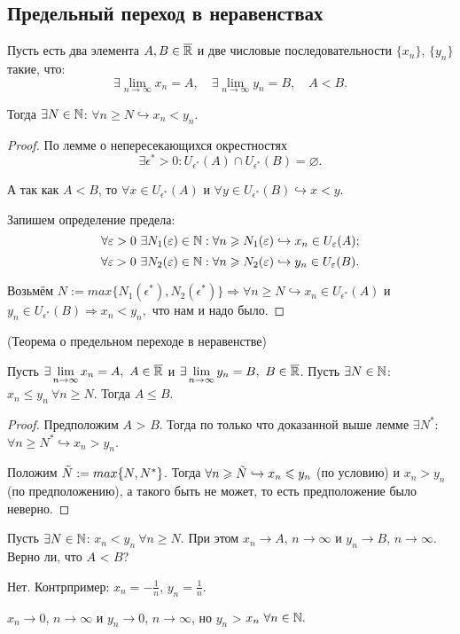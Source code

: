 \newpage
\subsection{Предельный переход в неравенствах}
\begin{lemma}
    Пусть есть два элемента $A, B \in \overline{\R}$ и две числовые последовательности $\{ x_{n} \}$, $\{ y_{n} \}$ такие, что:
    $$\exists \lim\limits_{n\to \infty} x_{n} = A, \quad \exists \lim\limits_{n\to \infty} y_{n} = B, \quad A < B.$$

    Тогда $\exists N \in \N$: $\forall n \geq N \hookrightarrow x_{n} < y_{n}.$
\end{lemma}
\begin{proof}
    По лемме о непересекающихся окрестностях 
    $$\exists \epsilon^{*} > 0: U_{\epsilon^{*}} (A) \cap U_{\epsilon^{*}} (B) = \varnothing.$$

    А так как $A < B$, то $\forall x \in U_{\epsilon^{*}} (A)$ и $\forall y \in U_{\epsilon^{*}} (B) \hookrightarrow x < y.$

    Запишем определение предела:
    $$\forall \epsilon > 0 \  \exists N_{1} (\epsilon) \in \N: \forall n \geq N_{1} (\epsilon) \hookrightarrow x_{n} \in U_{\epsilon} (A);$$
    $$\forall \epsilon > 0 \  \exists N_{2} (\epsilon) \in \N: \forall n \geq N_{2} (\epsilon) \hookrightarrow y_{n} \in U_{\epsilon} (B).$$

    Возьмём $N := max \{ N_{1} (\epsilon^{*}), N_{2} (\epsilon^{*})\} \Rightarrow \forall n \geq N \hookrightarrow x_{n} \in U_{\epsilon^{*}} (A)$ и $y_{n} \in U_{\epsilon^{*}} (B) \Rightarrow x_{n} < y_{n},$ что нам и надо было.
\end{proof}
\begin{theorem}
    \hypertarget{thm2.3}{(Теорема о предельном переходе в неравенстве)} Пусть $\exists \lim\limits_{n\to \infty} x_{n} = A, \  A \in \overline{\R}$ и $\exists \lim\limits_{n\to \infty} y_{n} = B, \  B \in \overline{\R}$. Пусть $\exists N \in \N$: $x_{n} \leq y_{n} \  \forall n \geq N$. Тогда $A \leq B$.
\end{theorem}
\begin{proof}
    Предположим $A$ > $B$. Тогда по только что доказанной выше лемме $\exists N^{*}$: $\forall n \geq N^{*} \hookrightarrow x_{n} > y_{n}$.

    Положим $\Tilde{N} := max \{ N, N^{*} \}$. Тогда $\forall n \geq \Tilde{N} \hookrightarrow x_{n} \leq y_{n}$ (по условию) и $x_{n} > y_{n}$ (по предположению), а такого быть не может, то есть предположение было неверно.
\end{proof}
\begin{problem}
    Пусть $\exists N \in \N$: $x_{n} < y_{n} \  \forall n \geq N.$ При этом $x_{n} \to A$, $n\to \infty$ и $y_{n} \to B$, $n\to \infty$. Верно ли, что $A$ < $B$?
\end{problem}
\begin{solution}
    Нет. Контрпример: $\displaystyle x_{n} = -\frac{1}{n}$, $\displaystyle y_{n} = \frac{1}{n}.$

    $x_{n} \to 0$, $n\to \infty$ и $y_{n} \to 0$, $n\to \infty$, но $y_{n}$ > $x_{n} \  \forall n \in \N.$
\end{solution}

